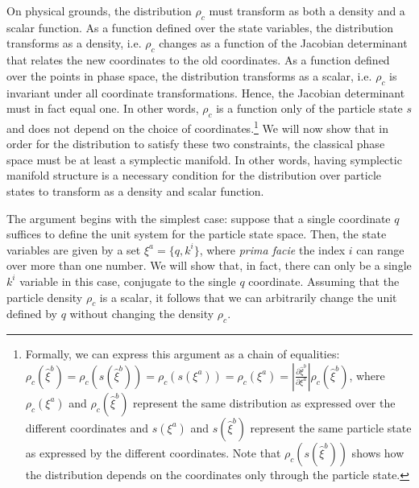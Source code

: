 \documentclass[letterpaper]{article}
\begin{document}
On physical grounds, the distribution $\rho_c$ must transform as both a density and a scalar function. As a function defined over the state variables, the distribution transforms as a density, i.e. $\rho_c$ changes as a function of the Jacobian determinant that relates the new coordinates to the old coordinates. As a function defined over the points in phase space, the distribution transforms as a scalar, i.e. $\rho_c$ is invariant under all coordinate transformations. Hence, the Jacobian determinant must in fact equal one. In other words, $\rho_c$ is a function only of the particle state $s$ and does not depend on the choice of coordinates.\footnote{Formally, we can express this argument as a chain of equalities: $\rho_c(\hat{\xi}^b)=\rho_c(s(\hat{\xi}^b))=\rho_c(s(\xi^a))=\rho_c(\xi^a) = \left|\frac{\partial \hat{\xi}^b}{\partial \xi^a} \right| \rho_c(\hat\xi^b)$, where $\rho_c(\xi^a)$ and $\rho_c(\hat{\xi}^b)$ represent the same distribution as expressed over the different coordinates and $s(\xi^a)$ and $s(\hat{\xi}^b)$ represent the same particle state as expressed by the different coordinates. Note that $\rho_c(s(\hat{\xi}^b))$ shows how the distribution depends on the coordinates only through the particle state.} We will now show that in order for the distribution to satisfy these two constraints, the classical phase space must be at least a symplectic manifold. In other words, having symplectic manifold structure is a necessary condition for the distribution over particle states to transform as a density and scalar function.

The argument begins with the simplest case: suppose that a single coordinate $q $ suffices to define the unit system for the particle state space. Then, the state variables are given by a set $\xi^a = \{ q, k^i \}$, where \textit{prima facie} the index $i$ can range over more than one number. We will show that, in fact, there can only be a single $k^i$ variable in this case, conjugate to the single $q$ coordinate. Assuming that the particle density $\rho_c$ is a scalar, it follows that we can arbitrarily change the unit defined by $q$ without changing the density $\rho_c$. 
\end{document}
